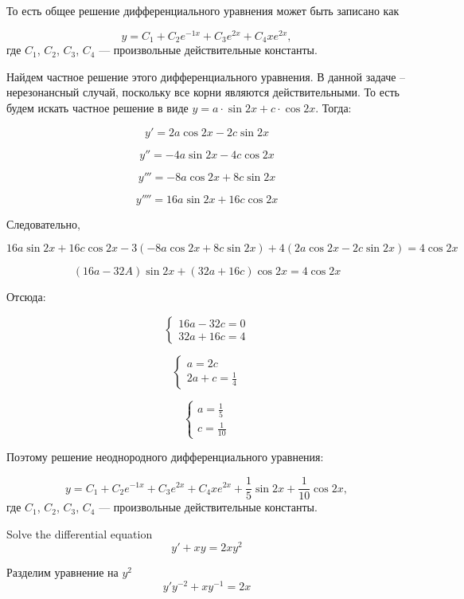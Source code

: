 \documentclass[addpoints]{exam} %
\begin{document}
\begin{questions}
\begin{solution}
То есть общее решение дифференциального уравнения может быть записано как

\[y=C_{1} +C_{2} e^{-1x} +C_{3} e^{2x} +C_{4} xe^{2x} ,\]
где $C_{1}$, $C_2$, $C_3$, $C_4$ --- произвольные действительные константы.

Найдем частное решение этого дифференциального уравнения. В данной задаче -- нерезонансный случай, поскольку все корни являются действительными. То есть будем искать частное решение в виде $y=a\cdot \sin 2x+c\cdot \cos 2x$. Тогда:

\[y' =2a\cos 2x-2c\sin 2x\]

\[y'' =-4a\sin 2x-4c\cos 2x\]

\[y''' =-8a\cos 2x+8c\sin 2x\]

\[y'''' =16a\sin 2x+16c\cos 2x\]

Следовательно,

\[16a\sin 2x+16c\cos 2x-3(-8a\cos 2x+8c\sin 2x)+4(2a\cos 2x-2c\sin 2x)=4\cos 2x\]

\[\left(16a-32A\right)\sin 2x+\left(32a+16c\right)\cos 2x=4\cos 2x\]

Отсюда:

\[\left\{\begin{array}{c} {16a-32c=0} \\ {32a+16c=4} \end{array}\right. \]

\[\left\{\begin{array}{c} {a=2c} \\ {2a+c=\frac{1}{4} } \end{array}\right. \]

\[\left\{\begin{array}{c} {a=\frac{1}{5} } \\ {c=\frac{1}{10} } \end{array}\right. \]

Поэтому решение неоднородного  дифференциального уравнения:

\[y=C_{1} +C_{2} e^{-1x} +C_{3} e^{2x} +C_{4} xe^{2x} +\frac{1}{5} \sin 2x+\frac{1}{10} \cos 2x,\]
где $C_{1}$, $C_2$, $C_3$, $C_4$ --- произвольные действительные константы.

\end{solution}

\question[10] Solve the differential equation
\[
y'+xy=2xy^2
\]

\begin{solution}

Разделим уравнение на $y^2$
\[
y'y^{-2}+xy^{-1}=2x
\]


\end{solution}
\end{questions}
\end{document}
